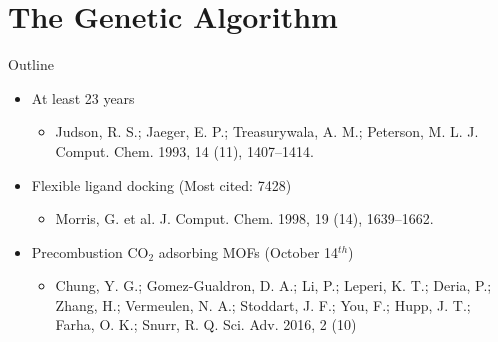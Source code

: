 \documentclass[10pt]{beamer}
\begin{document}
\section{The Genetic Algorithm}

{%
\begin{frame}{Outline}
	\begin{itemize}
		\item{At least 23 years
    		\begin{itemize}
        		\item[]{Judson, R. S.; Jaeger, E. P.; Treasurywala, A. M.; Peterson, M. L. J. Comput. Chem. 1993, 14 (11), 1407–1414.}
        	\end{itemize}
        }
		\item {Flexible ligand docking (Most cited: 7428) 
    		\begin{itemize}
        		\item[]{Morris, G. et al. J. Comput. Chem. 1998, 19 (14), 1639$–$1662.}
        	\end{itemize}
		}

   		\item{Precombustion CO${}_2$ adsorbing MOFs (October 14${}^{th}$)
       		\begin{itemize}
           		\item[]{Chung, Y. G.; Gomez-Gualdron, D. A.; Li, P.; Leperi, K. T.; Deria, P.; Zhang, H.; Vermeulen, N. A.; Stoddart, J. F.; You, F.; Hupp, J. T.; Farha, O. K.; Snurr, R. Q. Sci. Adv. 2016, 2 (10)}
           	\end{itemize}
        }
	\end{itemize}
\end{frame}
}
\end{document}
